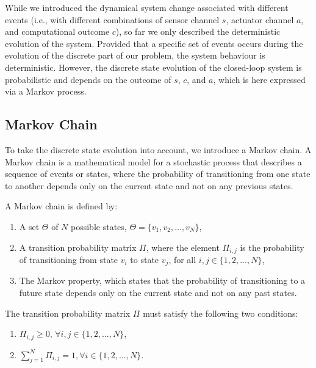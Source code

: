 While we introduced the dynamical system change associated with different events (i.e., with different combinations of sensor channel $s$, actuator channel $a$, and computational outcome $c$), so far we only described the deterministic evolution of the system.
Provided that a specific set of events occurs during the evolution of the discrete part of our problem, the system behaviour is deterministic.
However, the discrete state evolution of the closed-loop system is probabilistic and depends on the outcome of $s$, $c$, and $a$, which is here expressed via a Markov process.

\subsection{Markov Chain}%
\label{sec:mc}%

To take the discrete state evolution into account, we introduce a Markov chain.
A Markov chain is a mathematical model for a stochastic process that describes a sequence of events or states, where the probability of transitioning from one state to another depends only on the current state and not on any previous states.

\begin{definition}
    A Markov chain is defined by:
    \begin{enumerate}[label=(\roman*)]
        \item A set $\Theta$ of $N$ possible states, $\Theta = \{ v_1, v_2, \dots, v_N \}$,
        \item A transition probability matrix $\Pi$, where the element $\Pi_{i, j}$ is the probability of transitioning from state $v_i$ to state $v_j$, for all $i,j \in \{ 1,2, \dots ,N \}$,
        \item The Markov property, which states that the probability of transitioning to a future state depends only on the current state and not on any past states.
    \end{enumerate}
    The transition probability matrix $\Pi$ must satisfy the following two conditions:
    \begin{enumerate}[label=(\roman*)]
        \itemsep1pt
        \item $\Pi_{i, j} \geq 0, \, \forall i,j \in \{1,2,...,N\}$,
        \item $\sum^{N}_{j=1} \Pi_{i, j} = 1, \forall i \in \{1,2,...,N\}$.
    \end{enumerate}
\end{definition}

